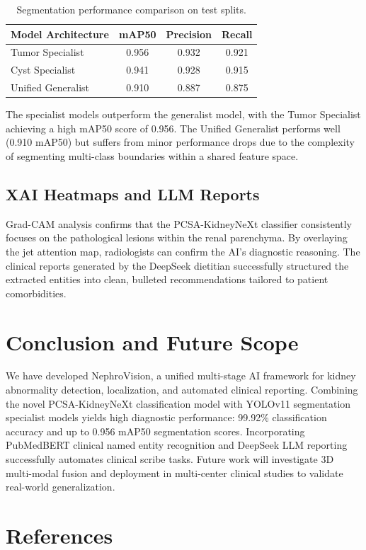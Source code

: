 \documentclass[preprint,12pt]{elsarticle}
\begin{document}
\begin{table}[h]
\centering
\caption{Segmentation performance comparison on test splits.}
\label{tab:segmentation_comparison}
\begin{tabular}{l c c c}
\toprule
\textbf{Model Architecture} & \textbf{mAP50} & \textbf{Precision} & \textbf{Recall} \\
\midrule
Tumor Specialist & 0.956 & 0.932 & 0.921 \\
Cyst Specialist & 0.941 & 0.928 & 0.915 \\
Unified Generalist & 0.910 & 0.887 & 0.875 \\
\bottomrule
\end{tabular}
\end{table}

The specialist models outperform the generalist model, with the Tumor Specialist achieving a high mAP50 score of 0.956. The Unified Generalist performs well (0.910 mAP50) but suffers from minor performance drops due to the complexity of segmenting multi-class boundaries within a shared feature space.

\subsection{XAI Heatmaps and LLM Reports}
Grad-CAM analysis confirms that the PCSA-KidneyNeXt classifier consistently focuses on the pathological lesions within the renal parenchyma. By overlaying the jet attention map, radiologists can confirm the AI's diagnostic reasoning. The clinical reports generated by the DeepSeek dietitian successfully structured the extracted entities into clean, bulleted recommendations tailored to patient comorbidities.

\section{Conclusion and Future Scope}
\label{sec:conclusion}
We have developed NephroVision, a unified multi-stage AI framework for kidney abnormality detection, localization, and automated clinical reporting. Combining the novel PCSA-KidneyNeXt classification model with YOLOv11 segmentation specialist models yields high diagnostic performance: 99.92\% classification accuracy and up to 0.956 mAP50 segmentation scores. Incorporating PubMedBERT clinical named entity recognition and DeepSeek LLM reporting successfully automates clinical scribe tasks. Future work will investigate 3D multi-modal fusion and deployment in multi-center clinical studies to validate real-world generalization.

\section*{References}


\end{document}
